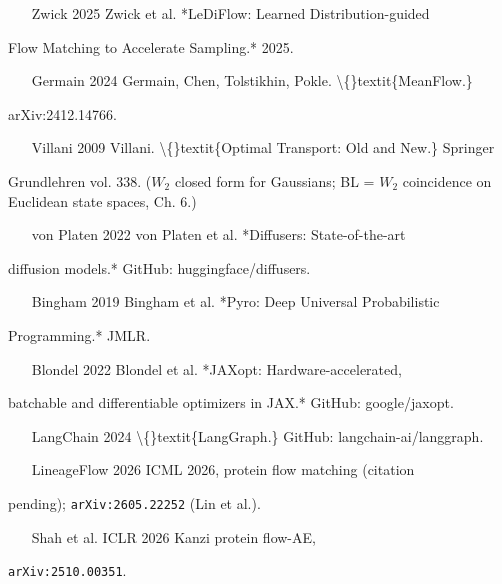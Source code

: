 \documentclass[preprint,3p,times,twocolumn]{elsarticle}
\begin{document}
\begin{itemize}
\item [Zwick 2025] Zwick et al. *LeDiFlow: Learned Distribution-guided
\end{itemize}
Flow Matching to Accelerate Sampling.* 2025.

\begin{itemize}
\item [Germain 2024] Germain, Chen, Tolstikhin, Pokle. \textbackslash\{\}textit\{MeanFlow.\}
\end{itemize}
arXiv:2412.14766.

\begin{itemize}
\item [Villani 2009] Villani. \textbackslash\{\}textit\{Optimal Transport: Old and New.\} Springer
\end{itemize}
Grundlehren vol. 338. ($W_2$ closed form for Gaussians; BL = $W_2$ coincidence on Euclidean state spaces, Ch. 6.)

\begin{itemize}
\item [von Platen 2022] von Platen et al. *Diffusers: State-of-the-art
\end{itemize}
diffusion models.* GitHub: huggingface/diffusers.

\begin{itemize}
\item [Bingham 2019] Bingham et al. *Pyro: Deep Universal Probabilistic
\end{itemize}
Programming.* JMLR.

\begin{itemize}
\item [Blondel 2022] Blondel et al. *JAXopt: Hardware-accelerated,
\end{itemize}
batchable and differentiable optimizers in JAX.* GitHub: google/jaxopt.

\begin{itemize}
\item [LangChain 2024] \textbackslash\{\}textit\{LangGraph.\} GitHub: langchain-ai/langgraph.
\item [LineageFlow 2026] ICML 2026, protein flow matching (citation
\end{itemize}
pending); \texttt{arXiv:2605.22252} (Lin et al.).

\begin{itemize}
\item [Shah et al. ICLR 2026] Kanzi  protein flow-AE,
\end{itemize}
\texttt{arXiv:2510.00351}.
\end{document}
